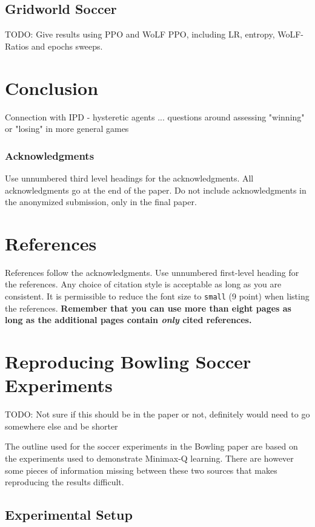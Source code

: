 \documentclass{article}
\newcommand\TODO[1]{{\color{red}TODO: #1}}
\begin{document}
\subsection{Gridworld Soccer}

\TODO{Give results using PPO and WoLF PPO, including LR, entropy, WoLF-Ratios and epochs sweeps.}

\section{Conclusion}

Connection with IPD - hysteretic agents ... questions around assessing "winning" or "losing" in more general games

\subsubsection*{Acknowledgments}

Use unnumbered third level headings for the acknowledgments. All acknowledgments
go at the end of the paper. Do not include acknowledgments in the anonymized
submission, only in the final paper.

\section*{References}

References follow the acknowledgments. Use unnumbered first-level heading for
the references. Any choice of citation style is acceptable as long as you are
consistent. It is permissible to reduce the font size to \verb+small+ (9 point)
when listing the references. {\bf Remember that you can use more than eight
  pages as long as the additional pages contain \emph{only} cited references.}
  
\section*{Reproducing Bowling Soccer Experiments}

\TODO{Not sure if this should be in the paper or not, definitely would need to go somewhere else and be shorter}

The outline used for the soccer experiments in the Bowling paper are based on the experiments used to demonstrate Minimax-Q learning. There are however some pieces of information missing between these two sources that makes reproducing the results difficult. 

\subsection*{Experimental Setup}
\end{document}
